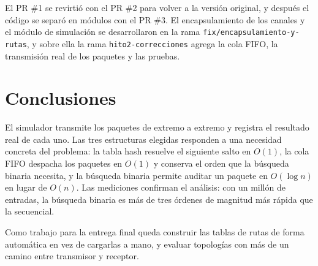 \documentclass[11pt,a4paper]{article}
\begin{document}
El PR \#1 se revirtió con el PR \#2 para volver a la versión original, y
después el código se separó en módulos con el PR \#3. El encapsulamiento de los
canales y el módulo de simulación se desarrollaron en la rama
\texttt{fix/encapsulamiento-y-rutas}, y sobre ella la rama
\texttt{hito2-correcciones} agrega la cola FIFO, la transmisión real de los
paquetes y las pruebas.

\section{Conclusiones}

El simulador transmite los paquetes de extremo a extremo y registra el
resultado real de cada uno. Las tres estructuras elegidas responden a una
necesidad concreta del problema: la tabla hash resuelve el siguiente salto en
$O(1)$, la cola FIFO despacha los paquetes en $O(1)$ y conserva el orden que
la búsqueda binaria necesita, y la búsqueda binaria permite auditar un paquete
en $O(\log n)$ en lugar de $O(n)$. Las mediciones confirman el análisis: con un
millón de entradas, la búsqueda binaria es más de tres órdenes de magnitud más
rápida que la secuencial.

Como trabajo para la entrega final queda construir las tablas de rutas de
forma automática en vez de cargarlas a mano, y evaluar topologías con más de
un camino entre transmisor y receptor.
\end{document}
